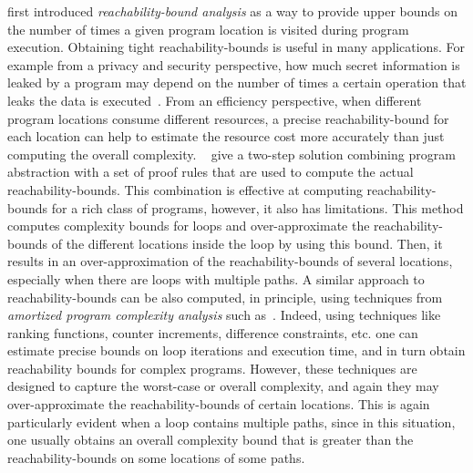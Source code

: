 
\cite{GulwaniZ10} first introduced \emph{reachability-bound analysis} as a way to provide upper bounds on the number of times a given program location 
is visited during program execution.
Obtaining tight reachability-bounds is useful in many applications.
For example from a privacy and security perspective,
how much secret information is leaked by a program may depend on the number of times a certain operation that leaks the data
is executed~\cite{Malacaria07}.
From an efficiency perspective, when different program locations consume different resources, a precise reachability-bound for each location can help to estimate the resource cost more accurately than just computing the overall complexity.
~\cite{GulwaniZ10}
give a two-step solution combining program abstraction with a set of proof rules that are used to compute the actual reachability-bounds. This combination is effective at computing reachability-bounds for a rich class of programs, however, it also has limitations. 
This method 
computes complexity bounds for loops and over-approximate the reachability-bounds of the different locations inside the loop by using this bound. Then, it results in an over-approximation of the reachability-bounds of several locations, especially when there are loops with multiple paths.
%
A similar approach to reachability-bounds can be also computed, in principle, using techniques from \emph{amortized program complexity analysis} such as~\cite{BradleyMS05,CookSZ13,Zuleger18,SinnZV14,SinnZV17,LuCT21,AliasDFG10}. Indeed, using techniques like ranking functions, counter increments, difference constraints, etc.
one can estimate 
precise bounds on loop iterations and execution time, and in turn obtain reachability bounds for complex programs. However, these techniques are designed to capture the worst-case or overall complexity, and again they may over-approximate the reachability-bounds of certain locations. This is again particularly evident when a loop contains multiple paths, since in this situation, one usually obtains an overall complexity bound that is greater than the reachability-bounds on some locations of some paths. 

